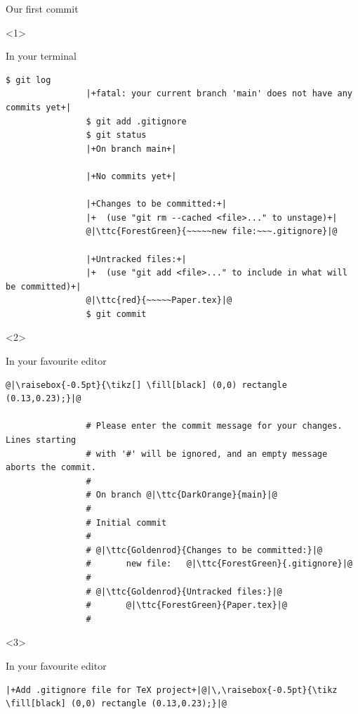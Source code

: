 \documentclass[usenames,svgnames,14pt]{beamer}
\newcommand{\ttc}[2]{\texttt{\textcolor{#1}{#2}}}
\begin{document}
\begin{frame}[fragile]{Our first commit}
    \vspace{-0.09\textheight}
    \begin{overlayarea}{\textwidth}{0.7\textheight}
        \begin{onlyenv}<1>
            \centerline{In your terminal}
            \begin{lstlisting}[style=MyBash, aboveskip=2mm, xleftmargin=-1mm, xrightmargin=-1mm]
                $ git log
                |+fatal: your current branch 'main' does not have any commits yet+|
                $ git add .gitignore
                $ git status
                |+On branch main+|

                |+No commits yet+|

                |+Changes to be committed:+|
                |+  (use "git rm --cached <file>..." to unstage)+|
                @|\ttc{ForestGreen}{~~~~~new file:~~~.gitignore}|@

                |+Untracked files:+|
                |+  (use "git add <file>..." to include in what will be committed)+|
                @|\ttc{red}{~~~~~Paper.tex}|@
                $ git commit
            \end{lstlisting}
        \end{onlyenv}
        \begin{onlyenv}<2>
            \centerline{In your favourite editor}
            \begin{lstlisting}[style=MyBash, aboveskip=2mm, xleftmargin=-3mm, xrightmargin=-3mm]
                @|\raisebox{-0.5pt}{\tikz[] \fill[black] (0,0) rectangle (0.13,0.23);}|@

                # Please enter the commit message for your changes. Lines starting
                # with '#' will be ignored, and an empty message aborts the commit.
                #
                # On branch @|\ttc{DarkOrange}{main}|@
                #
                # Initial commit
                #
                # @|\ttc{Goldenrod}{Changes to be committed:}|@
                #       new file:   @|\ttc{ForestGreen}{.gitignore}|@
                #
                # @|\ttc{Goldenrod}{Untracked files:}|@
                #       @|\ttc{ForestGreen}{Paper.tex}|@
                #
            \end{lstlisting}
        \end{onlyenv}
        \begin{onlyenv}<3>
            \centerline{In your favourite editor}
            \begin{lstlisting}[style=MyBash, aboveskip=2mm, xleftmargin=-3mm, xrightmargin=-3mm]
                |+Add .gitignore file for TeX project+|@|\,\raisebox{-0.5pt}{\tikz \fill[black] (0,0) rectangle (0.13,0.23);}|@


\end{lstlisting}
\end{onlyenv}
\end{overlayarea}
\end{frame}
\end{document}
